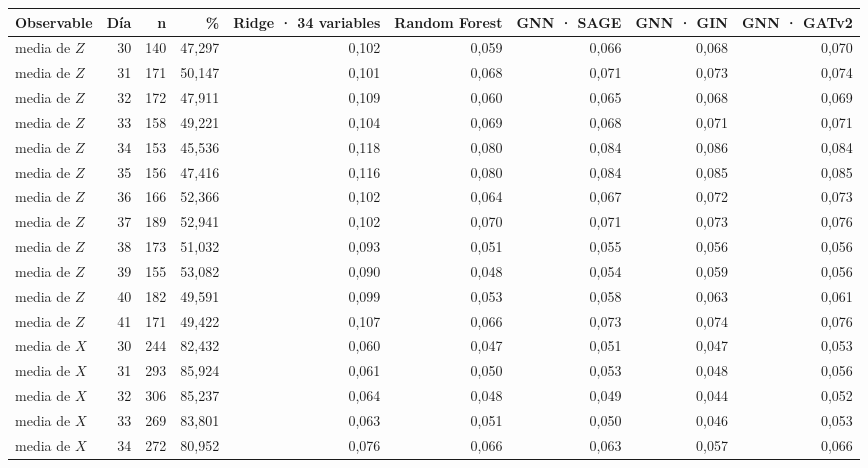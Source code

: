 \begin{table}[htbp]
    \centering
    {\footnotesize
    \begin{tabular}{@{}lrrrrrrrr@{}}
        \toprule
        \textbf{Observable} & \textbf{Día} & \textbf{n} & \textbf{\%} & \textbf{Ridge · 34 variables} & \textbf{Random Forest} & \textbf{GNN · SAGE} & \textbf{GNN · GIN} & \textbf{GNN · GATv2} \\
        \midrule
        media de $Z$ & 30 & 140 & 47,297 & 0,102 & 0,059 & 0,066 & 0,068 & 0,070 \\
        media de $Z$ & 31 & 171 & 50,147 & 0,101 & 0,068 & 0,071 & 0,073 & 0,074 \\
        media de $Z$ & 32 & 172 & 47,911 & 0,109 & 0,060 & 0,065 & 0,068 & 0,069 \\
        media de $Z$ & 33 & 158 & 49,221 & 0,104 & 0,069 & 0,068 & 0,071 & 0,071 \\
        media de $Z$ & 34 & 153 & 45,536 & 0,118 & 0,080 & 0,084 & 0,086 & 0,084 \\
        media de $Z$ & 35 & 156 & 47,416 & 0,116 & 0,080 & 0,084 & 0,085 & 0,085 \\
        media de $Z$ & 36 & 166 & 52,366 & 0,102 & 0,064 & 0,067 & 0,072 & 0,073 \\
        media de $Z$ & 37 & 189 & 52,941 & 0,102 & 0,070 & 0,071 & 0,073 & 0,076 \\
        media de $Z$ & 38 & 173 & 51,032 & 0,093 & 0,051 & 0,055 & 0,056 & 0,056 \\
        media de $Z$ & 39 & 155 & 53,082 & 0,090 & 0,048 & 0,054 & 0,059 & 0,056 \\
        media de $Z$ & 40 & 182 & 49,591 & 0,099 & 0,053 & 0,058 & 0,063 & 0,061 \\
        media de $Z$ & 41 & 171 & 49,422 & 0,107 & 0,066 & 0,073 & 0,074 & 0,076 \\
        media de $X$ & 30 & 244 & 82,432 & 0,060 & 0,047 & 0,051 & 0,047 & 0,053 \\
        media de $X$ & 31 & 293 & 85,924 & 0,061 & 0,050 & 0,053 & 0,048 & 0,056 \\
        media de $X$ & 32 & 306 & 85,237 & 0,064 & 0,048 & 0,049 & 0,044 & 0,052 \\
        media de $X$ & 33 & 269 & 83,801 & 0,063 & 0,051 & 0,050 & 0,046 & 0,053 \\
        media de $X$ & 34 & 272 & 80,952 & 0,076 & 0,066 & 0,063 & 0,057 & 0,066 \\

\end{tabular}}
\end{table}
